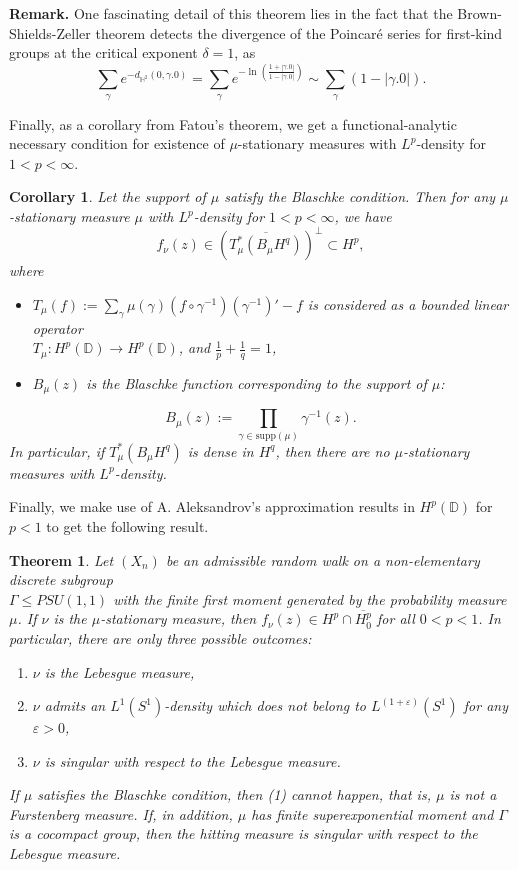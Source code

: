 \documentclass[11pt]{article}
\newtheorem{theorem}{Theorem}[section]
\newtheorem{corollary}{Corollary}[section]
\begin{document}
\textbf{Remark.} One fascinating detail of this theorem lies in the fact that the Brown-Shields-Zeller theorem detects the divergence of the Poincar\'e series for first-kind groups at the critical exponent $\delta = 1$, as
\[
\sum_{\gamma} e^{- d_{\mathbb{H}^2}(0, \gamma.0)} = \sum_{\gamma} e^{-\ln\left( \frac{1 + |\gamma.0|}{1 - |\gamma.0|} \right)} \sim \sum_{\gamma} (1 - |\gamma.0|).
\]

Finally, as a corollary from Fatou's theorem, we get a functional-analytic necessary condition for existence of $\mu$-stationary measures with $L^p$-density for $1 < p < \infty$.

\begin{corollary}
	\label{functional-analytic necessary condition}
	Let the support of $\mu$ satisfy the Blaschke condition. Then for any $\mu$-stationary measure $\mu$ with $L^p$-density for $1 < p < \infty$, we have
	\[
	f_\nu(z) \in (\overline{T_\mu^*(B_\mu H^q)})^{\perp} \subset H^p,
	\]
	where
	\begin{itemize}
		\item $T_\mu(f) := \sum_{\gamma} \mu(\gamma) (f \circ \gamma^{-1}) (\gamma^{-1})' - f$ is considered as a bounded linear operator \\ $T_\mu : H^p(\mathbb{D}) \rightarrow H^p(\mathbb{D})$, and $\frac{1}{p} + \frac{1}{q} = 1$,
		\item $B_\mu(z)$ is the Blaschke function corresponding to the support of $\mu$:
	\end{itemize}
	\[
	B_\mu(z) := \prod_{\gamma \in \text{supp}(\mu)} \gamma^{-1}(z).
	\]
	In particular, if $T_\mu^*(B_\mu H^q)$ is dense in $H^q$, then there are no $\mu$-stationary measures with $L^p$-density.
\end{corollary}

Finally, we make use of A. Aleksandrov's approximation results in $H^p(\mathbb{D})$ for $p < 1$ to get the following result.

\begin{theorem}
	\label{intro: singularity conjecture}
	Let $(X_n)$ be an admissible random walk on a non-elementary discrete subgroup \\ $\Gamma \leq PSU(1,1)$ with the finite first moment generated by the probability measure $\mu$. If $\nu$ is the $\mu$-stationary measure, then $f_\nu(z) \in H^p \cap \overline{H^p_0}$ for all $0 < p < 1$. In particular, there are only three possible outcomes:
	\begin{enumerate}[label=(\arabic*)]
		\item $\nu$ is the Lebesgue measure,
		\item $\nu$ admits an $L^1(S^1)$-density which does not belong to $L^{(1+\varepsilon)}(S^1)$ for any $\varepsilon > 0$,
		\item $\nu$ is singular with respect to the Lebesgue measure.
	\end{enumerate}
	If $\mu$ satisfies the Blaschke condition, then (1) cannot happen, that is, $\mu$ is not a Furstenberg measure. If, in addition, $\mu$ has finite superexponential moment and $\Gamma$ is a cocompact group, then the hitting measure is singular with respect to the Lebesgue measure.
\end{theorem}
\end{document}
